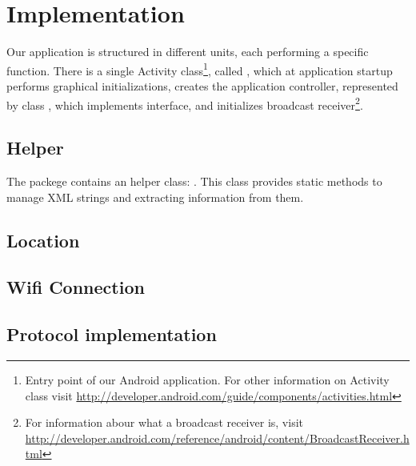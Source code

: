 \section{Implementation}
\label{sec:implementation}

Our application is structured in different units, each performing a specific function. There is a single Activity class\footnote{Entry point of our Android application. For other information on Activity class visit \url{http://developer.android.com/guide/components/activities.html}}, called , which at application startup performs graphical initializations, creates the application controller, represented by class , which implements  interface, and initializes broadcast receiver\footnote{For information abour what a broadcast receiver is, visit \url{http://developer.android.com/reference/android/content/BroadcastReceiver.html}}.

\subsection{Helper}
The packege  contains an helper class: . This class provides static methods to manage XML strings and extracting information from them.
\subsection{Location}
\subsection{Wifi Connection}
\subsection{Protocol implementation}

